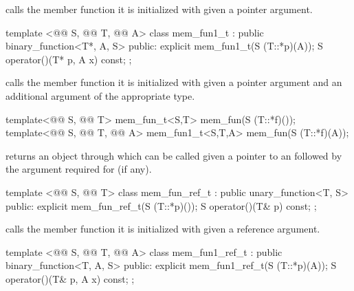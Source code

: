 \documentclass[american,twoside]{book}
\begin{document}
\begin{itemdescr}
\pnum
{} calls the member function it is initialized with given a pointer
argument.
\end{itemdescr}

%
\begin{itemdecl}
template <@@ S, @@ T, @@ A> class mem_fun1_t
      : public binary_function<T*, A, S> {
public:
  explicit mem_fun1_t(S (T::*p)(A));
  S operator()(T* p, A x) const;
};
\end{itemdecl}

\begin{itemdescr}
\pnum
{} calls the member function it is initialized with given
a pointer argument and an additional argument of the appropriate type.
\end{itemdescr}

%
\begin{itemdecl}
template<@@ S, @@ T> mem_fun_t<S,T>
   mem_fun(S (T::*f)());
template<@@ S, @@ T, @@ A> mem_fun1_t<S,T,A>
   mem_fun(S (T::*f)(A));
\end{itemdecl}

\begin{itemdescr}
\pnum
{} returns an object through which  can be
called given a pointer to an  followed by the argument required for
 (if any).
\end{itemdescr}

%
\begin{itemdecl}
template <@@ S, @@ T> class mem_fun_ref_t
      : public unary_function<T, S> {
public:
  explicit mem_fun_ref_t(S (T::*p)());
  S operator()(T& p) const;
};
\end{itemdecl}

\begin{itemdescr}
\pnum
{} calls the member function it is initialized with given
a reference argument.
\end{itemdescr}

%
\begin{itemdecl}
template <@@ S, @@ T, @@ A> class mem_fun1_ref_t
      : public binary_function<T, A, S> {
public:
  explicit mem_fun1_ref_t(S (T::*p)(A));
  S operator()(T& p, A x) const;
};
\end{itemdecl}
\end{document}
